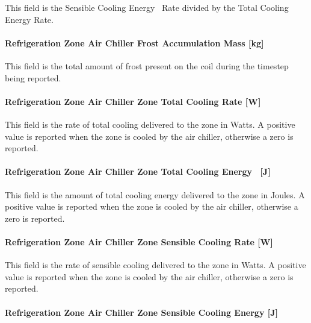 This field is the Sensible Cooling Energy ~Rate divided by the Total Cooling Energy Rate.

\paragraph{Refrigeration Zone Air Chiller Frost Accumulation Mass {[}kg{]}}\label{refrigeration-zone-air-chiller-frost-accumulation-mass-kg}

This field is the total amount of frost present on the coil during the timestep being reported.

\paragraph{Refrigeration Zone Air Chiller Zone Total Cooling Rate {[}W{]}}\label{refrigeration-zone-air-chiller-zone-total-cooling-rate-w}

This field is the rate of total cooling delivered to the zone in Watts. A positive value is reported when the zone is cooled by the air chiller, otherwise a zero is reported.

\paragraph{Refrigeration Zone Air Chiller Zone Total Cooling Energy ~{[}J{]}}\label{refrigeration-zone-air-chiller-zone-total-cooling-energy-j}

This field is the amount of total cooling energy delivered to the zone in Joules. A positive value is reported when the zone is cooled by the air chiller, otherwise a zero is reported.

\paragraph{Refrigeration Zone Air Chiller Zone Sensible Cooling Rate {[}W{]}}\label{refrigeration-zone-air-chiller-zone-sensible-cooling-rate-w}

This field is the rate of sensible cooling delivered to the zone in Watts. A positive value is reported when the zone is cooled by the air chiller, otherwise a zero is reported.

\paragraph{Refrigeration Zone Air Chiller Zone Sensible Cooling Energy {[}J{]}}\label{refrigeration-zone-air-chiller-zone-sensible-cooling-energy-j}

